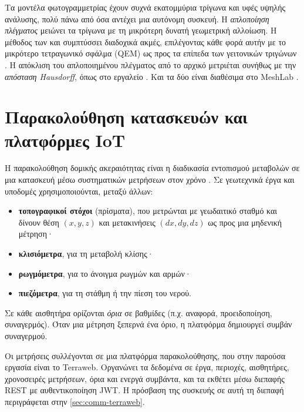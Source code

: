 Τα μοντέλα φωτογραμμετρίας έχουν συχνά εκατομμύρια τρίγωνα και υφές υψηλής ανάλυσης, πολύ πάνω από όσα αντέχει μια αυτόνομη συσκευή. Η \emph{απλοποίηση πλέγματος} μειώνει τα τρίγωνα με τη μικρότερη δυνατή γεωμετρική αλλοίωση. Η μέθοδος των  και  συμπτύσσει διαδοχικά ακμές, επιλέγοντας κάθε φορά αυτήν με το μικρότερο τετραγωνικό σφάλμα (QEM) ως προς τα επίπεδα των γειτονικών τριγώνων \cite{garland1997qem}. Η απόκλιση του απλοποιημένου πλέγματος από το αρχικό μετριέται συνήθως με την \emph{απόσταση Hausdorff}, όπως στο εργαλείο  \cite{cignoni1998metro}. Και τα δύο είναι διαθέσιμα στο MeshLab \cite{cignoni2008meshlab}.

\section{Παρακολούθηση κατασκευών και πλατφόρμες IoT}
\label{sec:bg-shm}

Η παρακολούθηση δομικής ακεραιότητας είναι η διαδικασία εντοπισμού μεταβολών σε μια κατασκευή μέσω συστηματικών μετρήσεων στον χρόνο \cite{farrar2007shm}. Σε γεωτεχνικά έργα και υποδομές χρησιμοποιούνται, μεταξύ άλλων:
\begin{itemize}
  \item \textbf{τοπογραφικοί στόχοι} (πρίσματα), που μετρώνται με γεωδαιτικό σταθμό και δίνουν θέση $(x, y, z)$ και μετακινήσεις $(dx, dy, dz)$ ως προς μια μηδενική μέτρηση·
  \item \textbf{κλισιόμετρα}, για τη μεταβολή κλίσης·
  \item \textbf{ρωγμόμετρα}, για το άνοιγμα ρωγμών και αρμών·
  \item \textbf{πιεζόμετρα}, για τη στάθμη ή την πίεση του νερού.
\end{itemize}
Σε κάθε αισθητήρα ορίζονται \emph{όρια} σε βαθμίδες (π.χ. αναφορά, προειδοποίηση, συναγερμός). Όταν μια μέτρηση ξεπερνά ένα όριο, η πλατφόρμα δημιουργεί συμβάν συναγερμού.

Οι μετρήσεις συλλέγονται σε μια πλατφόρμα παρακολούθησης, που στην παρούσα εργασία είναι το Terraweb. Οργανώνει τα δεδομένα σε έργα, περιοχές, αισθητήρες, χρονοσειρές μετρήσεων, όρια και ενεργά συμβάντα, και τα εκθέτει μέσω διεπαφής REST \cite{fielding2000rest} με αυθεντικοποίηση JWT. Η πρόσβαση της συσκευής σε αυτή τη διεπαφή περιγράφεται στην \cref{sec:comm-terraweb}.


